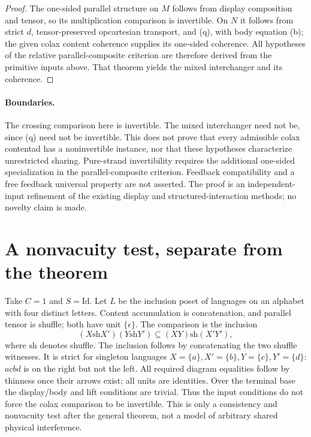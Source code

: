 \documentclass[11pt]{article}
\begin{document}
\begin{proof}
The one-sided parallel structure on $M$ follows from display composition and tensor, so its multiplication comparison is invertible. On $N$ it follows from strict $d$, tensor-preserved opcartesian transport, and (q), with body equation (b); the given colax content coherence supplies its one-sided coherence. All hypotheses of the relative parallel-composite criterion are therefore derived from the primitive inputs above. That theorem yields the mixed interchanger and its coherence.
\end{proof}

\paragraph{Boundaries.} The crossing comparison here is invertible. The mixed interchanger need not be, since (q) need not be invertible. This does not prove that every admissible colax contentad has a noninvertible instance, nor that these hypotheses characterize unrestricted sharing. Pure-strand invertibility requires the additional one-sided specialization in the parallel-composite criterion. Feedback compatibility and a free feedback universal property are not asserted. The proof is an independent-input refinement of the existing display and structured-interaction methods; no novelty claim is made.
\section{A nonvacuity test, separate from the theorem}
Take $C=1$ and $S=\mathrm{Id}$. Let $L$ be the inclusion poset of languages on an alphabet with four distinct letters. Content accumulation is concatenation, and parallel tensor is shuffle; both have unit $\{\epsilon\}$. The comparison is the inclusion
\[
 (X\mathbin{\mathrm{sh}}X')(Y\mathbin{\mathrm{sh}}Y')
 \subseteq (XY)\mathbin{\mathrm{sh}}(X'Y'),
\]
where $\mathrm{sh}$ denotes shuffle. The inclusion follows by concatenating the two shuffle witnesses. It is strict for singleton languages $X=\{a\},X'=\{b\},Y=\{c\},Y'=\{d\}$: $acbd$ is on the right but not the left. All required diagram equalities follow by thinness once their arrows exist; all units are identities. Over the terminal base the display/body and lift conditions are trivial. Thus the input conditions do not force the colax comparison to be invertible. This is only a consistency and nonvacuity test after the general theorem, not a model of arbitrary shared physical interference.
\end{document}
